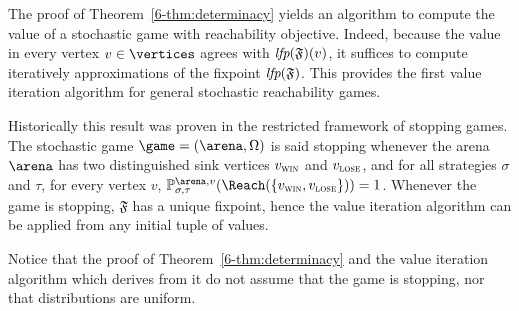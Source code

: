 The proof of Theorem~\cref{6-thm:determinacy} yields an algorithm to
compute the value of a stochastic game with reachability
objective. Indeed, because the value in every vertex $v \in \vertices$
agrees with $\textit{lfp}(\mathfrak{F})(v)$, it suffices to compute
iteratively approximations of the fixpoint $\textit{lfp}(\mathfrak{F})$.  This
provides the first value iteration algorithm for general stochastic
reachability games.

Historically this result was proven in the restricted framework of
stopping games. The stochastic game $\game = (\arena,\Omega)$ is said
stopping whenever the arena $\arena$ has two distinguished sink
vertices $v_{\textsc{win}}$ and $v_{\textsc{lose}}$, and for all strategies $\sigma$ and
$\tau$, for every vertex $v$,
$\probm_{\sigma,\tau}^{\arena,v}(\Reach(\{\vwin,\vlose\})) =
1$. Whenever the game is stopping, $\mathfrak{F}$ has a unique
fixpoint, hence the value iteration algorithm can be applied from any
initial tuple of values.



Notice that the proof of Theorem~\cref{6-thm:determinacy} and the value
iteration algorithm which derives from it do not assume that the game
is stopping, nor that distributions are uniform.
